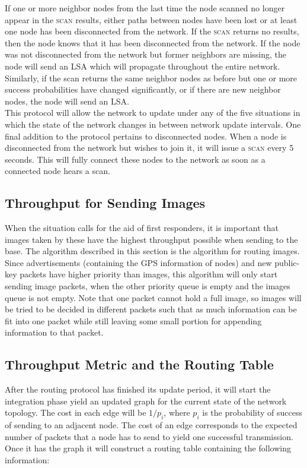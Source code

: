 \documentclass[letterpaper]{article}
\begin{document}
\noindent If one or more neighbor nodes from the last time the node scanned no longer appear in 
the \textsc{scan} results, either paths between nodes have been lost or at least one node has
been disconnected from the network. If the \textsc{scan} returns no results, then the node knows
that it has been disconnected from the network. If the node was not disconnected from the network
but former neighbors are missing, the node will send an LSA which will propagate throughout the
entire network. Similarly, if the scan returns the same neighbor nodes as before but one or more
success probabilities have changed significantly, or if there are new neighbor nodes, the node will
send an LSA.
\\

\noindent This protocol will allow the network to update under any of the five situations in which
the state of the network changes in between network update intervals. One final addition to the
protocol pertains to disconnected nodes. When a node is disconnected from the network but wishes to
join it, it will issue a \textsc{scan} every 5 seconds. This will fully connect these nodes to the
network as soon as a connected node hears a scan. 

\subsection{Throughput for Sending Images}

When the situation calls for the aid of first responders, it is important that images taken by these have the highest throughput possible when sending to the base. The algorithm described in this section is the algorithm for routing images. Since advertisements (containing the GPS information of nodes) and new public-key packets have higher priority than images, this algorithm will only start sending image packets, when the other priority queue is empty and the images queue is not empty. Note that one packet cannot hold a full image, so images will be tried to be decided in different packets such that as much information can be fit into one packet while still leaving some small portion for appending information to that packet.

\subsection{Throughput Metric and the Routing Table}

After the routing protocol has finished its update period, it will start the integration phase yield an updated graph for the current state of the network topology. The cost in each edge will be $1/p_{i}$, where $p_{i}$ is the probability of success of sending to an adjacent node. The cost of an edge corresponds to the expected number of packets that a node has to send to yield one successful transmission. Once it has the graph it will construct a routing table containing the following information:
\end{document}
